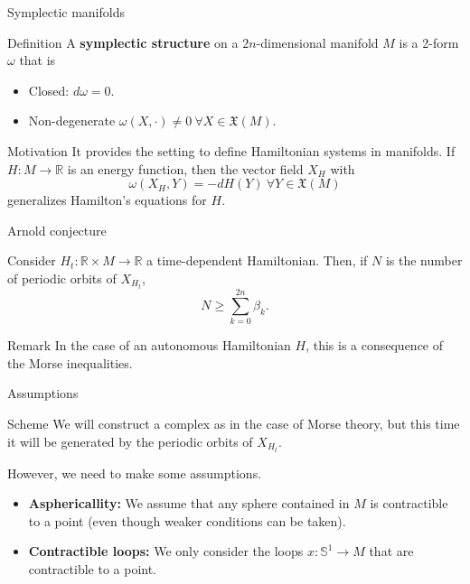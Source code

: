 \documentclass{beamer}
\newcommand{\con}[1]{\mathbb{#1}}
\newcommand{\R}{\con{R}}
\begin{document}
\begin{frame}{Symplectic manifolds}
	\begin{block}{Definition}
		A {\bf symplectic structure} on a $2n$-dimensional manifold $M$ is a 2-form $\omega$ that is
		\begin{itemize}
			\item Closed: $d\omega = 0$.
			\item Non-degenerate $\omega(X,\cdot) \neq 0 \ \forall X \in \mathfrak{X}(M)$.
		\end{itemize}
	\end{block}

	\begin{block}{Motivation}
		It provides the setting to define Hamiltonian systems in manifolds. If $H : M \rightarrow \R$ is an energy function, then the vector field $X_H$ with
		\[\omega(X_H,Y) = -dH(Y) \ \forall Y \in \mathfrak{X}(M)\]
		generalizes Hamilton's equations for $H$.
	\end{block}
\end{frame}

\begin{frame}{Arnold conjecture}
	\begin{theorem}[Arnold]
		Consider $H_t : \R \times M \rightarrow \R$ a time-dependent Hamiltonian. Then, if $N$ is the number of periodic orbits of $X_{H_t}$,
		\[N \geq \sum_{k=0}^{2n} \beta_k .\]
	\end{theorem}

	\begin{block}{Remark}
		In the case of an autonomous Hamiltonian $H$, this is a consequence of the Morse inequalities.
	\end{block}
\end{frame}

\begin{frame}{Assumptions}
	\begin{block}{Scheme}
		We will construct a complex as in the case of Morse theory, but this time it will be generated by the periodic orbits of $X_{H_t}$.

		However, we need to make some assumptions.
	\end{block}
	\begin{itemize}
		\item {\bf Asphericallity:} We assume that any sphere contained in $M$ is contractible to a point (even though weaker conditions can be taken).
		\item {\bf Contractible loops:} We only consider the loops $x : \con{S}^1 \rightarrow M$ that are contractible to a point.
	\end{itemize}
\end{frame}
\end{document}
